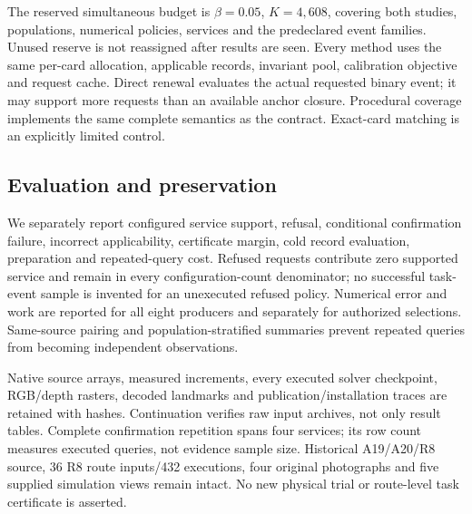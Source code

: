 The reserved simultaneous budget is $\beta=0.05$, $K=4,608$, covering both studies, populations, numerical policies, services and the predeclared event families. Unused reserve is not reassigned after results are seen. Every method uses the same per-card allocation, applicable records, invariant pool, calibration objective and request cache. Direct renewal evaluates the actual requested binary event; it may support more requests than an available anchor closure. Procedural coverage implements the same complete semantics as the contract. Exact-card matching is an explicitly limited control.

\subsection{Evaluation and preservation}
We separately report configured service support, refusal, conditional confirmation failure, incorrect applicability, certificate margin, cold record evaluation, preparation and repeated-query cost. Refused requests contribute zero supported service and remain in every configuration-count denominator; no successful task-event sample is invented for an unexecuted refused policy. Numerical error and work are reported for all eight producers and separately for authorized selections. Same-source pairing and population-stratified summaries prevent repeated queries from becoming independent observations.

Native source arrays, measured increments, every executed solver checkpoint, RGB/depth rasters, decoded landmarks and publication/installation traces are retained with hashes. Continuation verifies raw input archives, not only result tables. Complete confirmation repetition spans four services; its row count measures executed queries, not evidence sample size. Historical A19/A20/R8 source, 36 R8 route inputs/432 executions, four original photographs and five supplied simulation views remain intact. No new physical trial or route-level task certificate is asserted.
